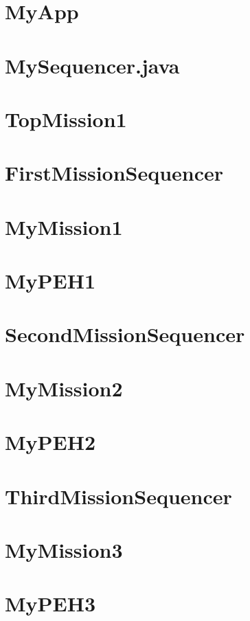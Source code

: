 \documentclass{article}
\begin{document}
\section{MyApp}

\newpage

\section{MySequencer.java}

\newpage

\section{TopMission1}

\newpage

\section{FirstMissionSequencer}

\newpage

\section{MyMission1}

\newpage

\section{MyPEH1}

\newpage

\section{SecondMissionSequencer}

\newpage

\section{MyMission2}

\newpage

\section{MyPEH2}

\newpage

\section{ThirdMissionSequencer}

\newpage


\section{MyMission3}

\newpage

\section{MyPEH3}

\newpage
\end{document}
